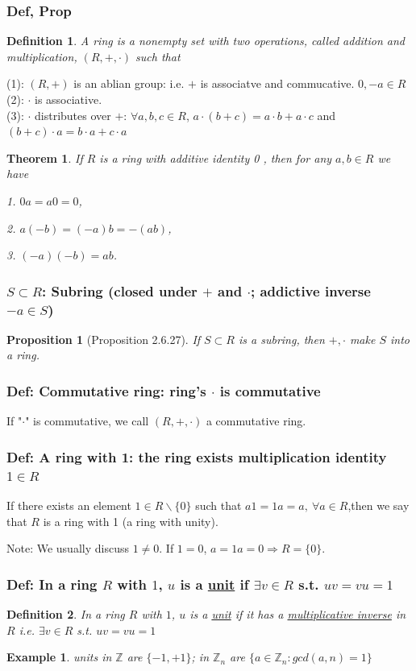 \documentclass[11pt,a4paper]{article}
\newtheorem{theorem}{Theorem}
\newtheorem{proposition}{Proposition}
\newtheorem{example}{Example}
\newtheorem{definition}{Definition}
\begin{document}
\subsubsection{Def, Prop}
\begin{definition}
    A ring is a nonempty set with two operations, called addition and multiplication, $(R,+,\cdot)$ such that
\end{definition}
(1): $(R,+)$ is an ablian group: i.e. $+$ is associatve and commucative. $0,-a\in R$\\
(2): $\cdot$ is associative.\\
(3): $\cdot$ distributes over $+$: $\forall a,b,c\in R$, $a\cdot(b+c)=a\cdot b+a\cdot c$ and $(b+c)\cdot a=b\cdot a+c\cdot a$

\begin{theorem}
    If $R$ is a ring with additive identity 0 , then for any $a, b \in R$ we have

    1. $0 a=a 0=0$,

    2. $a(-b)=(-a) b=-(a b)$,

    3. $(-a)(-b)=a b$.
\end{theorem}

\subsubsection{$S\subset R$: Subring (closed under $+$ and $\cdot$; addictive inverse $-a\in S$)}
\begin{proposition}[Proposition 2.6.27]
    If $S\subset R$ is a subring, then $+,\cdot$ make $S$ into a ring.
\end{proposition}

\subsubsection{Def: Commutative ring: ring's $\cdot$ is commutative}
If "$\cdot$" is commutative, we call $(R, +, \cdot)$ a commutative ring.
\subsubsection{Def: A ring with 1: the ring exists multiplication identity $1\in R$}
If there exists an element $1\in R\backslash \{0\}$ such that $a1=1a=a,\ \forall a\in R$,then we say that $R$ is a ring with 1 (a ring with unity).

Note: We usually discuss $1\neq 0$. If $1=0$, $a=1a=0 \Rightarrow R=\{0\}$.

\subsubsection{Def: In a ring $R$ with $1$, $u$ is a \underline{unit} if $\exists v\in R$ s.t. $uv=vu=1$}
\begin{definition}
    In a ring $R$ with $1$, $u$ is a \underline{unit} if it has a \underline{multiplicative
    inverse} in $R$ i.e. $\exists v\in R$ s.t. $uv=vu=1$
\end{definition}
\begin{example}
    units in $\mathbb{Z}$ are $\{-1,+1\}$; in $\mathbb{Z}_n$ are $\{a\in \mathbb{Z}_n:gcd(a,n)=1\}$
\end{example}
\end{document}
